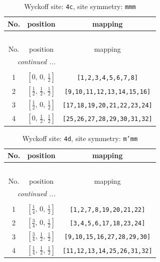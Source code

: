 \documentclass[fleqn,8pt]{jsarticle}
\begin{document}
\renewcommand{\arraystretch}{1.2}
\begin{longtable}{ccc}
\caption{Wyckoff site: {\tt 4c}, site symmetry: {\tt mmm}}
 \\
 \hline \hline
No. & position & mapping \\ \hline \endfirsthead

\multicolumn{2}{l}{\tablename\ \thetable{}} \\
 \hline \hline
No. & position & mapping \\ \hline \endhead

 \hline \hline
\multicolumn{2}{r}{\footnotesize\it continued ...} \\ \endfoot

 \hline \hline
\multicolumn{2}{r}{} \\ \endlastfoot

1 & $\left[ 0,\, 0,\, \frac{1}{2} \right]$ & {\tt [1,2,3,4,5,6,7,8]} \\ \hline
2 & $\left[ \frac{1}{2},\, \frac{1}{2},\, \frac{1}{2} \right]$ & {\tt [9,10,11,12,13,14,15,16]} \\ \hline
3 & $\left[ \frac{1}{2},\, 0,\, \frac{1}{2} \right]$ & {\tt [17,18,19,20,21,22,23,24]} \\ \hline
4 & $\left[ 0,\, \frac{1}{2},\, \frac{1}{2} \right]$ & {\tt [25,26,27,28,29,30,31,32]} \\
\end{longtable}
\renewcommand{\arraystretch}{1.2}
\begin{longtable}{ccc}
\caption{Wyckoff site: {\tt 4d}, site symmetry: {\tt m'mm}}
 \\
 \hline \hline
No. & position & mapping \\ \hline \endfirsthead

\multicolumn{2}{l}{\tablename\ \thetable{}} \\
 \hline \hline
No. & position & mapping \\ \hline \endhead

 \hline \hline
\multicolumn{2}{r}{\footnotesize\it continued ...} \\ \endfoot

 \hline \hline
\multicolumn{2}{r}{} \\ \endlastfoot

1 & $\left[ \frac{1}{4},\, 0,\, \frac{1}{2} \right]$ & {\tt [1,2,7,8,19,20,21,22]} \\ \hline
2 & $\left[ \frac{3}{4},\, 0,\, \frac{1}{2} \right]$ & {\tt [3,4,5,6,17,18,23,24]} \\ \hline
3 & $\left[ \frac{3}{4},\, \frac{1}{2},\, \frac{1}{2} \right]$ & {\tt [9,10,15,16,27,28,29,30]} \\ \hline
4 & $\left[ \frac{1}{4},\, \frac{1}{2},\, \frac{1}{2} \right]$ & {\tt [11,12,13,14,25,26,31,32]} \\
\end{longtable}
\end{document}
